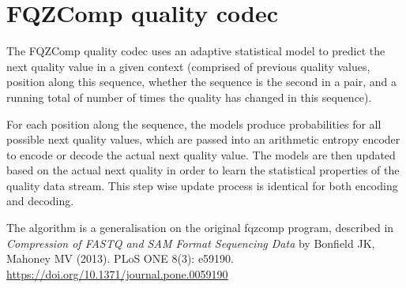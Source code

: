 \documentclass[a4paper]{article}
\begin{document}
\section{FQZComp quality codec}

%
%
%
%
%
%
%
%

The FQZComp quality codec uses an adaptive statistical model to
predict the next quality value in a given context (comprised of
previous quality values, position along this sequence, whether the
sequence is the second in a pair, and a running total of number of
times the quality has changed in this sequence).

For each position along the sequence, the models produce probabilities
for all possible next quality values, which are passed into an
arithmetic entropy encoder to encode or decode the actual next quality
value.  The models are then updated based on the actual next quality
in order to learn the statistical properties of the quality data
stream.  This step wise update process is identical for both encoding
and decoding.

The algorithm is a generalisation on the original fqzcomp program,
described in \textit{Compression of FASTQ and SAM Format Sequencing
  Data} by Bonfield JK, Mahoney MV (2013). PLoS ONE 8(3):
e59190. \url{https://doi.org/10.1371/journal.pone.0059190}
\end{document}
